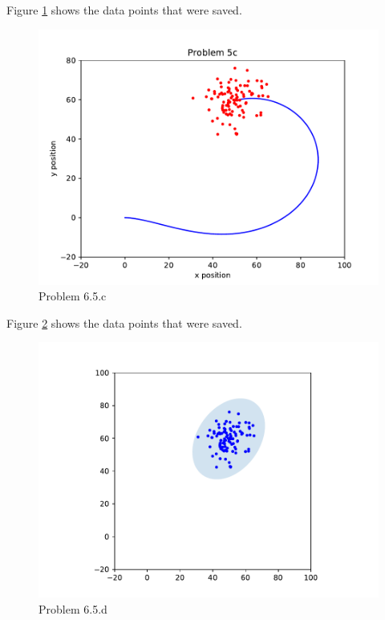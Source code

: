 \documentclass{article}
\begin{document}
\newpage
Figure \ref{fig:6.5.c} shows the data points that were saved.

\begin{figure}[h]
    \centering
    \includegraphics[pages=1]{p6-5-c}
    \caption{Problem 6.5.c}
    \label{fig:6.5.c}
\end{figure}


\newpage
Figure \ref{fig:6.5.d} shows the data points that were saved.

\begin{figure}[h]
    \centering
    \includegraphics[pages=1]{p6-5-d}
    \caption{Problem 6.5.d}
    \label{fig:6.5.d}
\end{figure}
\end{document}
